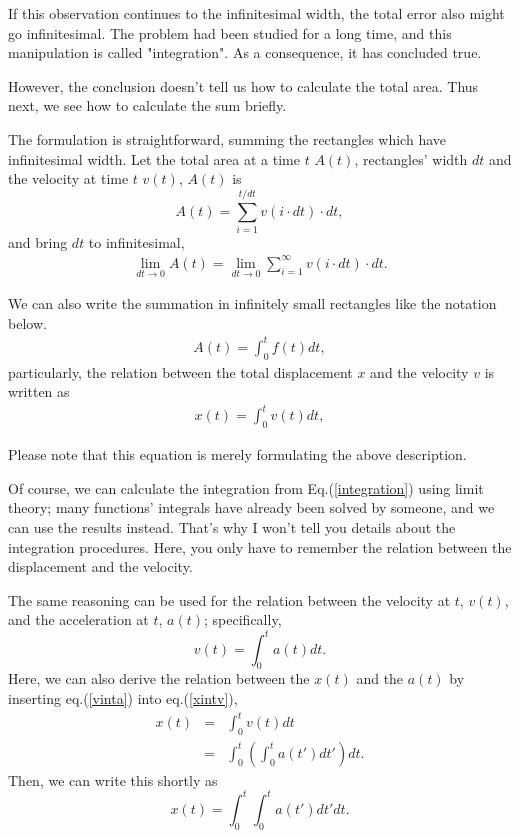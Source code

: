 \documentclass[pdflatex,sn-mathphys-num]{sn-jnl}%
\theoremstyle{thmstyleone}%
\theoremstyle{thmstyletwo}%
\theoremstyle{thmstylethree}%
\begin{document}
If this observation continues to the infinitesimal width, the total error also might go infinitesimal. The problem had been studied for a long time, and this manipulation is called "integration". As a consequence, it has concluded true.

However, the conclusion doesn't tell us how to calculate the total area. Thus next, we see how to calculate the sum briefly. 

The formulation is straightforward, summing the rectangles which have infinitesimal width.
Let the total area at a time $t$ $A(t)$, rectangles' width $dt$ and the velocity at time $t$ $v(t)$, $A(t)$ is
\begin{equation}
	A(t) = \sum_{i = 1}^{t/dt} v(i \cdot dt) \cdot dt ,
\end{equation}
and bring $dt$ to infinitesimal,
\begin{eqnarray}
	\label{integration}
	\lim_{dt \rightarrow 0} A(t) =\lim_{dt \rightarrow 0} \sum_{i=1}^{\infty}v(i \cdot dt) \cdot dt .
\end{eqnarray}

We can also write the summation in infinitely small rectangles like the notation below.
\begin{eqnarray}
	A(t) = \int_{0}^{t} f(t) dt ,
\end{eqnarray}
particularly, the relation between the total displacement $x$ and the velocity $v$ is written as
\begin{eqnarray}\label{xintv}
	x(t) = \int_{0}^{t} v(t) dt ,
\end{eqnarray}

Please note that this equation is merely formulating the above description.

Of course, we can calculate the integration from Eq.(\ref{integration}) using limit theory; many functions' integrals have already been solved by someone, and we can use the results instead. That's why I won't tell you details about the integration procedures. Here, you only have to remember the relation between the displacement and the velocity.

The same reasoning can be used for the relation between the velocity at $t$, $v(t)$, and the acceleration at $t$, $a(t)$; specifically,
\begin{equation}\label{vinta}
	v(t) = \int_{0}^{t} a(t) dt .
\end{equation}
Here, we can also derive the relation between the $x(t)$ and the $a(t)$ by inserting eq.(\ref{vinta}) into eq.(\ref{xintv}),
\begin{eqnarray}
	x(t) &=& \int_{0}^{t} v(t) dt\\
		&=& \int_{0}^{t}(\int_{0}^{t}a(t')dt')dt .
\end{eqnarray}
Then, we can write this shortly as
\begin{equation}
		x(t) = \int_{0}^{t}\int_{0}^{t}a(t')dt'dt .
\end{equation}
\end{document}
